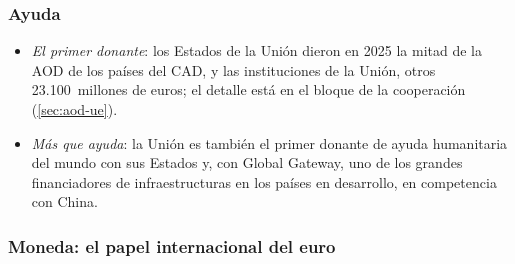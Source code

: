 \documentclass[11pt]{article}
\begin{document}
\subsubsection{Ayuda}\label{sec:peso-ayuda}

\begin{itemize}
\item \emph{El primer donante}: los Estados de la Unión dieron en 2025 la mitad de la AOD de los países del CAD, y las instituciones de la Unión, otros 23.100~millones de euros\nocite{OCDE2026DAC1}; el detalle está en el bloque de la cooperación (\ref{sec:aod-ue}).
\item \emph{Más que ayuda}: la Unión es también el primer donante de ayuda humanitaria del mundo con sus Estados y, con Global Gateway, uno de los grandes financiadores de infraestructuras en los países en desarrollo, en competencia con China.
\end{itemize}

\subsubsection{Moneda: el papel internacional del euro}\label{sec:euro}
\end{document}
